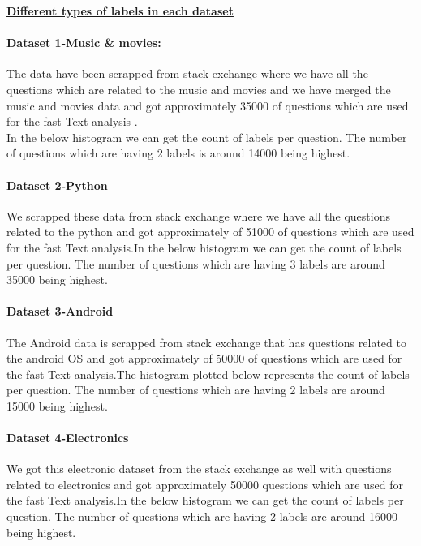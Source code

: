 \documentclass[a4paper,1pt]{article}
\begin{document}
\begin{center}
	\textbf{\underline{Different types of labels in each dataset}}
\end{center}

\paragraph{Dataset 1-Music \& movies:} The data have been scrapped from stack exchange where we have all the questions which are related to the music and movies and we have merged the music and movies data and got approximately 35000 of questions which are used for the fast Text analysis .\\
In the below histogram we can get the count of labels per question. The number of questions which are having 2 labels is around 14000 being highest. 

\paragraph{Dataset 2-Python}We scrapped these data from stack exchange where we have all the questions related to the python and got approximately of 51000 of questions which are used for the fast Text analysis.In the below histogram we can get the count of labels per question. The number of questions which are having 3 labels are around 35000 being highest. 




\paragraph{Dataset 3-Android}The Android data is scrapped from stack exchange that has questions related to the android OS and got approximately of 50000 of questions which are used for the fast Text analysis.The histogram plotted below represents the count of labels per question. The number of questions which are having 2 labels are around 15000 being highest.



\paragraph{Dataset 4-Electronics}We got this electronic dataset from the stack exchange as well with questions related to electronics and got approximately 50000 questions which are used for the fast Text analysis.In the below histogram we can get the count of labels per question. The number of questions which are having 2 labels are around 16000 being highest. 
\end{document}
